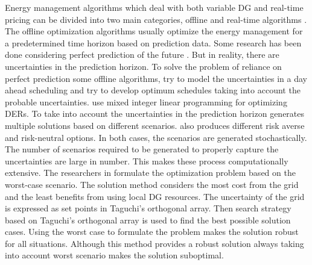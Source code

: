 Energy management algorithms which deal with both variable DG and real-time pricing can be divided into two main categories, offline and real-time algorithms \cite{rt_shi_2017}. The offline optimization algorithms usually optimize the energy management for a predetermined time horizon based on prediction data. Some research has been done considering perfect prediction of the future \cite{Off_1,off_2,off_3,off_4}. But in reality, there are uncertainties in the prediction horizon. To solve the problem of reliance on perfect prediction some offline algorithms, try to model the uncertainties in a day ahead scheduling and try to develop optimum schedules taking into account the probable uncertainties. \cite{ous_1,ous_2} use mixed integer linear programming for optimizing DERs. To take into account the uncertainties in the prediction horizon \cite{ous_2} generates multiple solutions based on different scenarios. \cite{ous_1} also produces different risk averse and risk-neutral options. In both cases, the scenarios are generated stochastically. The number of scenarios required to be generated to properly capture the uncertainties are large in number. This makes these process computationally extensive. The researchers in \cite{ous_3} formulate the optimization problem based on the worst-case scenario. The solution method considers the most cost from the grid and the least benefits from using local DG resources. The uncertainty of the grid is expressed as set points in Taguchi’s orthogonal array. Then search strategy based on Taguchi’s orthogonal array is used to find the best possible solution cases. Using the worst case to formulate the problem makes the solution robust for all situations. Although this method provides a robust solution always taking into account worst scenario makes the solution suboptimal. 

